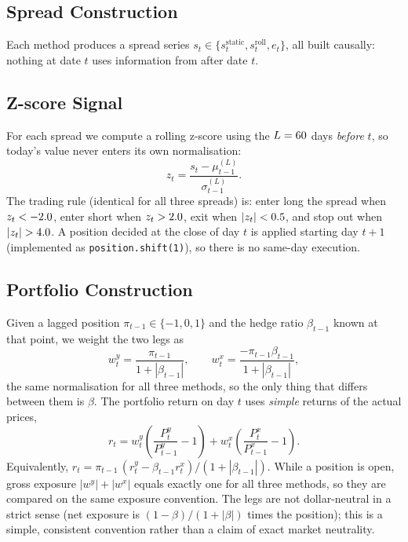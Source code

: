 \documentclass[11pt,a4paper]{article}
\begin{document}
\subsection{Spread Construction}
Each method produces a spread series $s_t\in\{s_t^{\text{static}},s_t^{\text{roll}},e_t\}$, all built causally: nothing at date $t$ uses information from after date $t$.

\subsection{Z-score Signal}\label{sec:z}
For each spread we compute a rolling z-score using the $L=60{}$ days \emph{before} $t$, so today's value never enters its own normalisation:
\begin{equation}
z_t = \frac{s_t - \mu_{t-1}^{(L)}}{\sigma_{t-1}^{(L)}}.
\end{equation}
The trading rule (identical for all three spreads) is: enter long the spread when $z_t<-2.0{}$, enter short when $z_t>2.0{}$, exit when $|z_t|<0.5{}$, and stop out when $|z_t|>\ZStop{}$. A position decided at the close of day $t$ is applied starting day $t+1$ (implemented as \texttt{position.shift(1)}), so there is no same-day execution.

\subsection{Portfolio Construction}\label{sec:port}
Given a lagged position $\pi_{t-1}\in\{-1,0,1\}$ and the hedge ratio $\beta_{t-1}$ known at that point, we weight the two legs as
\begin{equation}
w^y_t = \frac{\pi_{t-1}}{1+|\beta_{t-1}|}, \qquad w^x_t = \frac{-\pi_{t-1}\beta_{t-1}}{1+|\beta_{t-1}|},
\end{equation}
the same normalisation for all three methods, so the only thing that differs between them is $\beta$. The portfolio return on day $t$ uses \emph{simple} returns of the actual prices,
\begin{equation}
r_t = w^y_t\left(\frac{P^y_t}{P^y_{t-1}}-1\right) + w^x_t\left(\frac{P^x_t}{P^x_{t-1}}-1\right).
\end{equation}
Equivalently, $r_t=\pi_{t-1}\,(r^y_t-\beta_{t-1}r^x_t)/(1+|\beta_{t-1}|)$. While a position is open, gross exposure $|w^y|+|w^x|$ equals exactly one for all three methods, so they are compared on the same exposure convention. The legs are not dollar-neutral in a strict sense (net exposure is $(1-\beta)/(1+|\beta|)$ times the position); this is a simple, consistent convention rather than a claim of exact market neutrality.
\end{document}
